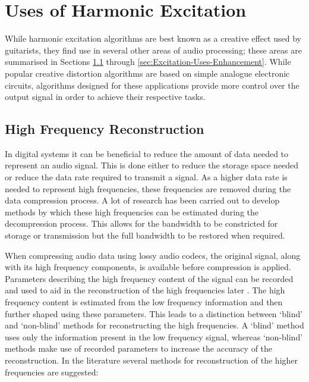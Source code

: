 \section{Uses of Harmonic Excitation}
\label{sec:Excitation-Uses}
	While harmonic excitation algorithms are best known as a creative effect used by guitarists, they find use in
	several other areas of audio processing; these areas are summarised in Sections
	\ref{sec:Excitation-Uses-Reconstruction} through \ref{sec:Excitation-Uses-Enhancement}. While popular creative
	distortion algorithms are based on simple analogue electronic circuits, algorithms designed for these applications
	provide more control over the output signal in order to achieve their respective tasks.

	\subsection{High Frequency Reconstruction}
	\label{sec:Excitation-Uses-Reconstruction}
		In digital systems it can be beneficial to reduce the amount of data needed to represent an audio signal.
		This is done either to reduce the storage space needed or reduce the data rate required to transmit a
		signal. As a higher data rate is needed to represent high frequencies, these frequencies are removed during
		the data compression process. A lot of research has been carried out to develop methods by which these high
		frequencies can be estimated during the decompression process. This allows for the bandwidth to be
		constricted for storage or transmission but the full bandwidth to be restored when required.

		When compressing audio data using lossy audio codecs, the original signal, along with its high frequency
		components, is available before compression is applied. Parameters describing the high frequency content of
		the signal can be recorded and used to aid in the reconstruction of the high frequencies later
		\citep{dietz2002spectral, friedrich2007spectral}. The high frequency content is estimated from the low
		frequency information and then further shaped using these parameters. This leads to a distinction between
		`blind' and `non-blind' methods for reconstructing the high frequencies. A `blind' method uses only the
		information present in the low frequency signal, whereas `non-blind' methods make use of recorded
		parameters to increase the accuracy of the reconstruction. In the literature several methods for
		reconstruction of the higher frequencies are suggested:

